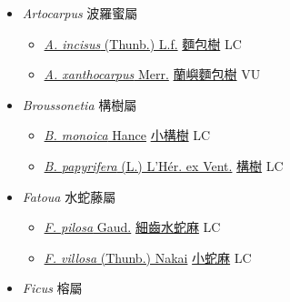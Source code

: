
  \begin{itemize}
 \item[] \textit{Artocarpus} 波羅蜜屬
                    
  \begin{itemize}
        \item[] \href{http://www.theplantlist.org/tpl1.1/search?q=Artocarpus+incisus}{\textit{A. incisus} (Thunb.) L.f.}   \href{\detokenize{http://taibnet.sinica.edu.tw/chi/taibnet_species_list.php?T2=麵包樹&T2_new_value=true&fr=y}}{麵包樹} LC
        \item[] \href{http://www.theplantlist.org/tpl1.1/search?q=Artocarpus+xanthocarpus}{\textit{A. xanthocarpus} Merr.}   \href{\detokenize{http://taibnet.sinica.edu.tw/chi/taibnet_species_list.php?T2=蘭嶼麵包樹&T2_new_value=true&fr=y}}{蘭嶼麵包樹} VU
  \end{itemize}
 \item[] \textit{Broussonetia} 構樹屬
                    
  \begin{itemize}
        \item[] \href{http://www.theplantlist.org/tpl1.1/search?q=Broussonetia+monoica}{\textit{B. monoica} Hance}     \href{\detokenize{http://taibnet.sinica.edu.tw/chi/taibnet_species_list.php?T2=小構樹&T2_new_value=true&fr=y}}{小構樹} LC
        \item[] \href{http://www.theplantlist.org/tpl1.1/search?q=Broussonetia+papyrifera}{\textit{B. papyrifera} (L.) L'Hér. ex Vent.}   \href{\detokenize{http://taibnet.sinica.edu.tw/chi/taibnet_species_list.php?T2=構樹&T2_new_value=true&fr=y}}{構樹} LC
  \end{itemize}
 \item[] \textit{Fatoua} 水蛇藤屬
                    
  \begin{itemize}
        \item[] \href{http://www.theplantlist.org/tpl1.1/search?q=Fatoua+pilosa}{\textit{F. pilosa} Gaud.}   \href{\detokenize{http://taibnet.sinica.edu.tw/chi/taibnet_species_list.php?T2=細齒水蛇麻&T2_new_value=true&fr=y}}{細齒水蛇麻} LC
        \item[] \href{http://www.theplantlist.org/tpl1.1/search?q=Fatoua+villosa}{\textit{F. villosa} (Thunb.) Nakai}   \href{\detokenize{http://taibnet.sinica.edu.tw/chi/taibnet_species_list.php?T2=小蛇麻&T2_new_value=true&fr=y}}{小蛇麻} LC
  \end{itemize}
 \item[] \textit{Ficus} 榕屬
                    

\end{itemize}
